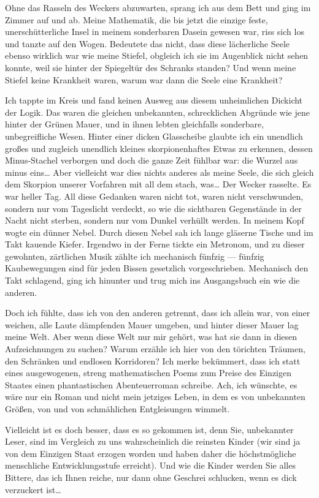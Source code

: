 Ohne das Rasseln des Weckers abzuwarten, sprang ich aus dem Bett
und ging im Zimmer auf und ab. Meine Mathematik, die bis jetzt die
einzige feste, unerschütterliche Insel in meinem sonderbaren Dasein
gewesen war, riss sich los und tanzte auf den Wogen. Bedeutete das
nicht, dass diese lächerliche Seele ebenso wirklich war wie meine
Stiefel, obgleich ich sie im Augenblick nicht sehen konnte, weil
sie hinter der Spiegeltür des Schranks standen? Und wenn meine
Stiefel keine Krankheit waren, warum war dann die Seele eine
Krankheit?

Ich tappte im Kreis und fand keinen Ausweg aus diesem unheimlichen
Dickicht der Logik. Das waren die gleichen unbekannten,
schrecklichen Abgründe wie jene hinter der Grünen Mauer, und in
ihnen lebten gleichfalls sonderbare, unbegreifliche Wesen. Hinter
einer dicken Glasscheibe glaubte ich ein unendlich großes und
zugleich unendlich kleines skorpionenhaftes Etwas zu erkennen,
dessen Minus-Stachel verborgen und doch die ganze Zeit fühlbar war:
die Wurzel aus minus eins\ldots{} Aber vielleicht war dies nichts
anderes als meine Seele, die sich gleich dem Skorpion unserer
Vorfahren mit all dem stach, was\ldots{} Der Wecker rasselte. Es war
heller Tag. All diese Gedanken waren nicht tot, waren nicht
verschwunden, sondern nur vom Tageslicht verdeckt, so wie die
sichtbaren Gegenstände in der Nacht nicht sterben, sondern nur vom
Dunkel verhüllt werden. In meinem Kopf wogte ein dünner Nebel.
Durch diesen Nebel sah ich lange gläserne Tische und im Takt
kauende Kiefer. Irgendwo in der Ferne tickte ein Metronom, und zu
dieser gewohnten, zärtlichen Musik zählte ich mechanisch fünfzig —
fünfzig Kaubewegungen sind für jeden Bissen gesetzlich
vorgeschrieben. Mechanisch den Takt schlagend, ging ich hinunter
und trug mich ins Ausgangsbuch ein wie die anderen.

Doch ich fühlte, dass ich von den anderen getrennt, dass ich allein
war, von einer weichen, alle Laute dämpfenden Mauer umgeben, und
hinter dieser Mauer lag meine Welt. Aber wenn diese Welt nur mir
gehört, was hat sie dann in diesen Aufzeichnungen zu suchen? Warum
erzähle ich hier von den törichten Träumen, den Schränken und
endlosen Korridoren? Ich merke bekümmert, dass ich statt eines
ausgewogenen, streng mathematischen Poems zum Preise des Einzigen
Staates einen phantastischen Abenteuerroman schreibe. Ach, ich
wünschte, es wäre nur ein Roman und nicht mein jetziges Leben, in
dem es von unbekannten Größen, von \wurzel{} und von schmählichen
Entgleisungen wimmelt.

Vielleicht ist es doch besser, dass es so gekommen ist, denn Sie,
unbekannter Leser, sind im Vergleich zu uns wahrscheinlich die
reinsten Kinder (wir sind ja von dem Einzigen Staat erzogen worden
und haben daher die höchstmögliche menschliche Entwicklungsstufe
erreicht). Und wie die Kinder werden Sie alles Bittere, das ich
Ihnen reiche, nur dann ohne Geschrei schlucken, wenn es dick
verzuckert ist\ldots{}


